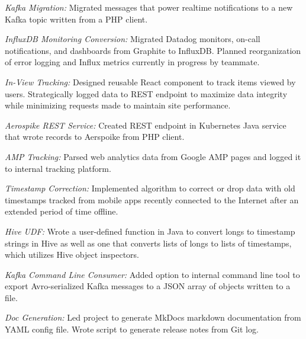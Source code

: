 \documentclass[letterpaper,11pt]{article}
\begin{document}
      \vspace{-5pt}
      \item{{\slshape Kafka Migration:} Migrated messages that power realtime notifications to a new Kafka topic written from a PHP client.}
      \vspace{-5pt}
      \item{{\slshape InfluxDB Monitoring Conversion:} Migrated Datadog monitors, on-call notifications, and dashboards from Graphite to InfluxDB. Planned reorganization of error logging and Influx metrics currently in progress by teammate.}
      \vspace{-5pt}
      \item{{\slshape In-View Tracking:} Designed reusable React component to track items viewed by users. Strategically logged data to REST endpoint to maximize data integrity while minimizing requests made to maintain site performance.}
      \vspace{-5pt}
      \item{{\slshape Aerospike REST Service:} Created REST endpoint in Kubernetes Java service that wrote records to Aerspoike from PHP client.}
      \vspace{-5pt}
      \item{{\slshape AMP Tracking:} Parsed web analytics data from Google AMP pages and logged it to internal tracking platform.}
      \vspace{-5pt}
      \item{{\slshape Timestamp Correction:} Implemented algorithm to correct or drop data with old timestamps tracked from mobile apps recently connected to the Internet after an extended period of time offline.}
      \vspace{-5pt}
      \item{{\slshape Hive UDF:} Wrote a user-defined function in Java to convert longs to timestamp strings in Hive as well as one that converts lists of longs to lists of timestamps, which utilizes Hive object inspectors.}
      \vspace{-5pt}
      \item{{\slshape Kafka Command Line Consumer:} Added option to internal command line tool to export Avro-serialized Kafka messages to a JSON array of objects written to a file.}
      \vspace{-5pt}
      \item{{\slshape Doc Generation:} Led project to generate MkDocs markdown documentation from YAML config file. Wrote script to generate release notes from Git log.}
      \vspace{-5pt}
\end{document}
